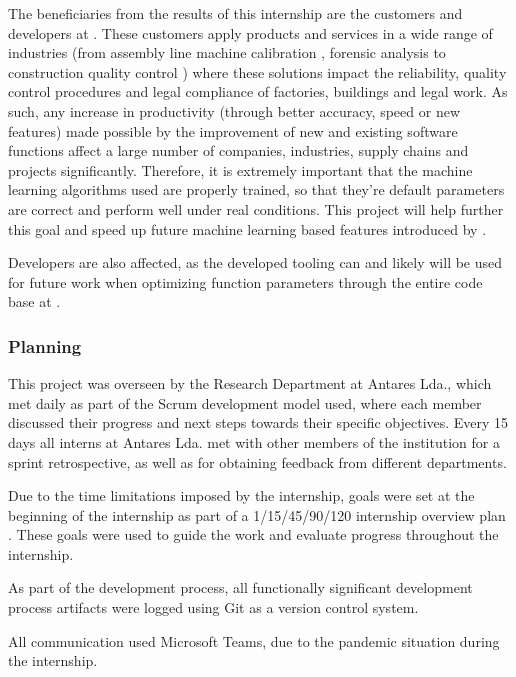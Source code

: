 The beneficiaries from the results of this internship are the customers and developers at \faro. These customers apply \faro products and services in a wide range of industries (from assembly line machine calibration \parencite{faro_man_eq_align}, forensic analysis \parencite{faro_forensic} to construction quality control \parencite{faro_construction}) where these solutions impact the reliability, quality control procedures and legal compliance of factories, buildings and legal work. As such, any increase in productivity (through better accuracy, speed or new features) made possible by the improvement of new and existing software functions affect a large number of companies, industries, supply chains and projects significantly. Therefore, it is extremely important that the machine learning algorithms used are properly trained, so that they're default parameters are correct and perform well under real conditions. This project will help further this goal and speed up future machine learning based features introduced by \faro.

Developers are also affected, as the developed tooling can and likely will be used for future work when optimizing function parameters through the entire code base at \faro.

\subsubsection{Planning}

This project was overseen by the Research Department at Antares Lda., which met daily as part of the Scrum development model used, where each member discussed their progress and next steps towards their specific objectives. Every 15 days all interns at Antares Lda. met with other members of the institution for a sprint retrospective, as well as for obtaining feedback from different departments.

Due to the time limitations imposed by the internship, goals were set at the beginning of the internship as part of a 1/15/45/90/120 internship overview plan . These goals were used to guide the work and evaluate progress throughout the internship.

As part of the development process, all functionally significant development process artifacts were logged using Git as a version control system.

All communication used Microsoft Teams, due to the pandemic situation during the internship.
